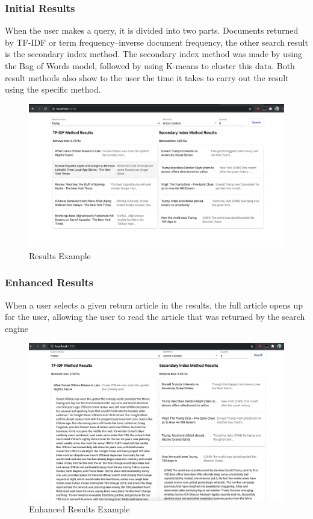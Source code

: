 \documentclass{article}
\begin{document}
\subsubsection{Initial Results}
When the user makes a query, it is divided into two parts. Documents returned by TF-IDF or term frequency–inverse document frequency, the other search result is the secondary index method. The secondary index method was made by using the Bag of Words model, followed by using K-means to cluster this data. Both result methods also show to the user the time it takes to carry out the result using the specific method.
\begin{figure}[htp]
    \centering
    \includegraphics[width=15cm]{Results.png}
    \caption{Results Example}
\end{figure}
\subsubsection{Enhanced Results}
When a user selects a given return article in the results, the full article opens up for the user, allowing the user to read the article that was returned by the search engine
\begin{figure}[htp]
    \centering
    \includegraphics[width=15cm]{ResultsDetail.png}
    \caption{Enhanced Results Example}
\end{figure}
\newpage
\end{document}

